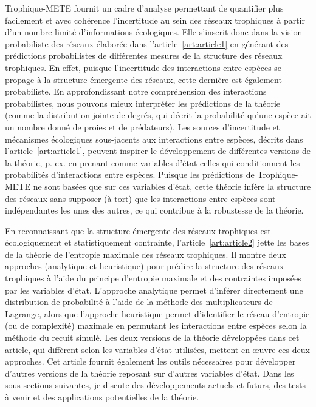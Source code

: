 Trophique-METE fournit un cadre d'analyse permettant de quantifier plus
facilement et avec cohérence l'incertitude au sein des réseaux trophiques à
partir d'un nombre limité d'informations écologiques. Elle s'inscrit donc dans
la vision probabiliste des réseaux élaborée dans l'article~\ref{art:article1} en
générant des prédictions probabilistes de différentes mesures de la structure
des réseaux trophiques. En effet, puisque l'incertitude des interactions entre
espèces se propage à la structure émergente des réseaux, cette dernière est
également probabiliste. En approfondissant notre compréhension des interactions
probabilistes, nous pouvons mieux interpréter les prédictions de la théorie
(comme la distribution jointe de degrés, qui décrit la probabilité qu'une espèce
ait un nombre donné de proies et de prédateurs). Les sources d'incertitude et
mécanismes écologiques sous-jacents aux interactions entre espèces, décrits dans
l'article~\ref{art:article1}, peuvent inspirer le développement de différentes
versions de la théorie, p. ex. en prenant comme variables d'état celles qui
conditionnent les probabilités d'interactions entre espèces. Puisque les
prédictions de Trophique-METE ne sont basées que sur ces variables d'état, cette
théorie infère la structure des réseaux sans supposer (à tort) que les
interactions entre espèces sont indépendantes les unes des autres, ce qui
contribue à la robustesse de la théorie.

En reconnaissant que la structure émergente des réseaux trophiques est
écologiquement et statistiquement contrainte, l'article~\ref{art:article2} jette
les bases de la théorie de l'entropie maximale des réseaux trophiques. Il montre
deux approches (analytique et heuristique) pour prédire la structure des réseaux
trophiques à l'aide du principe d'entropie maximale et des contraintes imposées
par les variables d'état. L'approche analytique permet d'inférer directement une
distribution de probabilité à l'aide de la méthode des multiplicateurs de
Lagrange, alors que l'approche heuristique permet d'identifier le réseau
d'entropie (ou de complexité) maximale en permutant les interactions entre
espèces selon la méthode du recuit simulé. Les deux versions de la théorie
développées dans cet article, qui diffèrent selon les variables d'état
utilisées, mettent en œuvre ces deux approches. Cet article fournit également
les outils nécessaires pour développer d'autres versions de la théorie reposant
sur d'autres variables d'état. Dans les sous-sections suivantes, je discute des
développements actuels et futurs, des tests à venir et des applications
potentielles de la théorie. 

